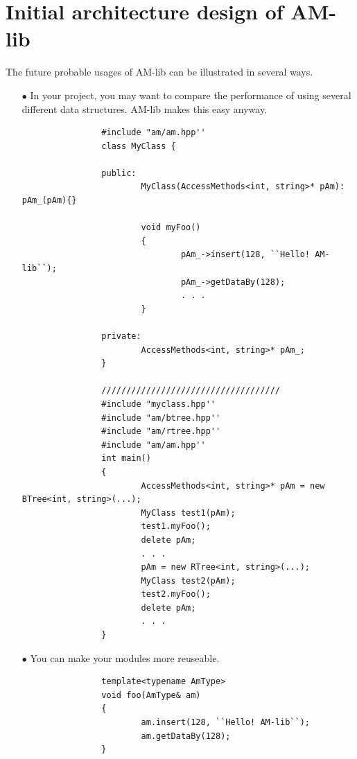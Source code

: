 \documentclass[a4paper,10pt]{article}
\begin{document}
\section{Initial architecture design of AM-lib}
The future probable usages of AM-lib can be illustrated in several ways.
\begin{itemize}
 \item[$\bullet$] In your project, you may want to compare the performance of using several different data structures. AM-lib makes this easy anyway.

\begin{scriptsize}\begin{verbatim}
                #include "am/am.hpp''
                class MyClass {

                public: 
                        MyClass(AccessMethods<int, string>* pAm): pAm_(pAm){}

                        void myFoo()
                        {
                                pAm_->insert(128, ``Hello! AM-lib``);
                                pAm_->getDataBy(128);
                                . . .
                        }

                private:
                        AccessMethods<int, string>* pAm_;
                }

                ////////////////////////////////////
                #include "myclass.hpp''
                #include "am/btree.hpp''
                #include "am/rtree.hpp''
                #include "am/am.hpp''
                int main()
                {
                        AccessMethods<int, string>* pAm = new BTree<int, string>(...);
                        MyClass test1(pAm);
                        test1.myFoo();
                        delete pAm;
                        . . .
                        pAm = new RTree<int, string>(...);
                        MyClass test2(pAm);
                        test2.myFoo();
                        delete pAm;
                        . . .
                }
\end{verbatim}                \end{scriptsize}

 \item[$\bullet$] You can make your modules more reuseable.
\begin{scriptsize}\begin{verbatim}
                template<typename AmType>
                void foo(AmType& am)
                {
                        am.insert(128, ``Hello! AM-lib``);
                        am.getDataBy(128);
                }


\end{verbatim}
\end{scriptsize}
\end{itemize}
\end{document}
